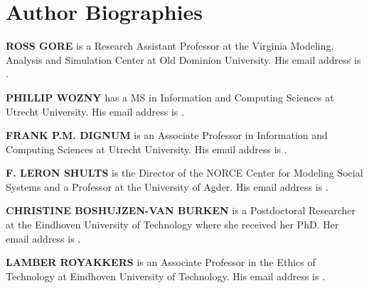 \documentclass{scspaperproc}
\theoremstyle{scsthe}
\begin{document}
\section*{Author Biographies}

\textbf{\uppercase{ROSS GORE}} is a Research Assistant Professor at the Virginia Modeling, Analysis and Simulation Center at Old Dominion University. His email address is .

\textbf{\uppercase{PHILLIP WOZNY}} has a MS in Information and Computing Sciences at Utrecht University. His email address is .

\textbf{\uppercase{FRANK P.M. DIGNUM}} is an Associate Professor in Information and Computing Sciences at Utrecht University. His email address is .

\textbf{\uppercase{F. LERON SHULTS}} is the Director of the NORCE Center for Modeling Social Systems and a Professor at the University of Agder. His email address is .

\textbf{\uppercase{CHRISTINE BOSHUJZEN-VAN BURKEN}} is a Postdoctoral Researcher at the Eindhoven University of Technology where she received her PhD. Her email address is .

\textbf{\uppercase{LAMBER ROYAKKERS}} is an Associate Professor in the Ethics of Technology at Eindhoven University of Technology. His email address is .
\end{document}

